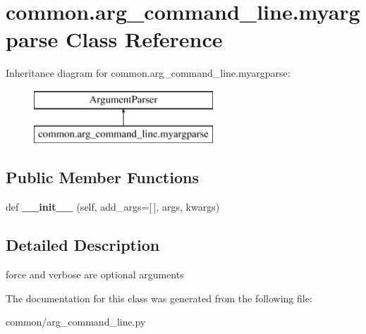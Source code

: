 \hypertarget{classcommon_1_1arg__command__line_1_1myargparse}{}\section{common.\+arg\+\_\+command\+\_\+line.\+myargparse Class Reference}
\label{classcommon_1_1arg__command__line_1_1myargparse}
Inheritance diagram for common.\+arg\+\_\+command\+\_\+line.\+myargparse\+:\begin{figure}[H]
\begin{center}
\leavevmode
\includegraphics[height=2.000000cm]{classcommon_1_1arg__command__line_1_1myargparse}
\end{center}
\end{figure}
\subsection*{Public Member Functions}
\begin{DoxyCompactItemize}
\item 
def {\bfseries \+\_\+\+\_\+init\+\_\+\+\_\+} (self, add\+\_\+args=\mbox{[}$\,$\mbox{]}, args, kwargs)\hypertarget{classcommon_1_1arg__command__line_1_1myargparse_ac031cd12a64950e55c49e6df15fa487d}{}\label{classcommon_1_1arg__command__line_1_1myargparse_ac031cd12a64950e55c49e6df15fa487d}

\end{DoxyCompactItemize}


\subsection{Detailed Description}
\begin{DoxyVerb}force and verbose are optional arguments
\end{DoxyVerb}
 

The documentation for this class was generated from the following file\+:\begin{DoxyCompactItemize}
\item 
common/arg\+\_\+command\+\_\+line.\+py\end{DoxyCompactItemize}
